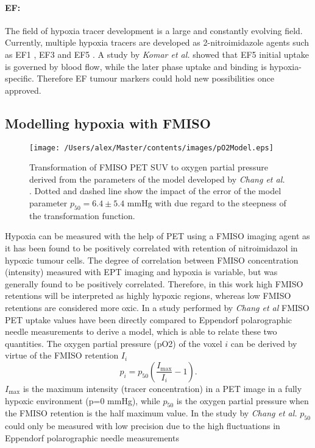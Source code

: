 \paragraph{EF: }The field of hypoxia tracer development is a large and constantly evolving field. Currently, multiple hypoxia tracers are developed as 2-nitroimidazole agents such as EF1 \cite{pmid10688119}, EF3 \cite{pmid17334763} and EF5 \cite{pmid12552344}. A study by \textit{Komar et al.} \cite{pmid18997048} showed that EF5 initial uptake is governed by blood flow, while the later phase uptake and binding is hypoxia-specific. Therefore EF tumour markers could hold new possibilities once approved.
\subsection{Modelling hypoxia with FMISO}
\begin{figure}[htb]
\centering
\texttt{[image: /Users/alex/Master/contents/images/pO2Model.eps]}
\vspace{1cm}
\caption{Transformation of FMISO PET SUV to oxygen partial pressure derived from the parameters of the model developed by \textit{Chang et al.}\cite{pmid19994538} . Dotted and dashed line show the impact of the error of the model parameter $p_{50} = 6.4 \pm 5.4$ mmHg with due regard to the steepness of the transformation function. }
\label{fig:pO2Model}
\end{figure}
Hypoxia can be measured with the help of PET using a FMISO imaging agent as it has been found to be positively correlated with retention of nitroimidazol in hypoxic tumour cells. The degree of correlation between FMISO concentration (intensity) measured with EPT imaging and hypoxia is variable, but was generally found to be positively correlated. Therefore, in this work high FMISO retentions will be interpreted as highly hypoxic regions, whereas low FMISO retentions are considered more oxic. In a study performed by \textit{Chang et al} \cite{pmid19994538} FMISO PET uptake values have been directly compared to Eppendorf polarographic needle measurements to derive a model, which is able to relate these two quantities. The oxygen partial pressure (pO2) of the voxel $i$ can be derived by virtue of the FMISO retention $I_i$
\begin{equation}\label{eq:changmodel}
p_i = p_\mathrm{50}\left(\frac{I_\mathrm{max}}{I_i}-1\right).
\end{equation}
$I_\mathrm{max}$ is the maximum intensity (tracer concentration) in a PET image in a fully hypoxic environment (p=0 mmHg), while $p_\mathrm{50}$ is the oxygen partial pressure when the FMISO retention is the half maximum value. In the study by \textit{Chang et al.} \cite{pmid19994538} $p_\mathrm{50}$ could only be measured with low precision due to the high fluctuations in Eppendorf polarographic needle measurements
